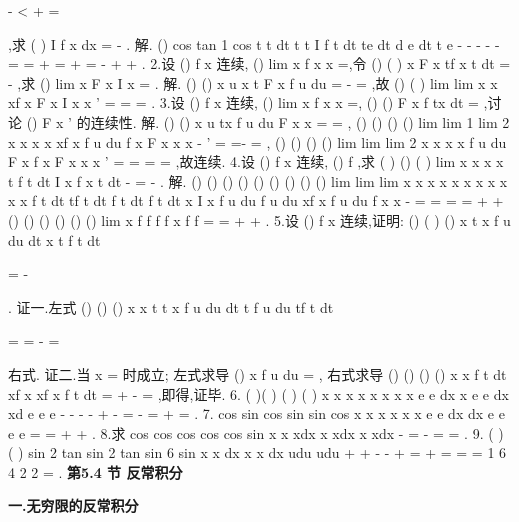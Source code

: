 -\le 
<
+
=

\ge 

,求
(
)
I
f x
dx
=
-
\int 
. 
解.
()
cos
tan
1 cos
t
t
dt
t
t
I
f t dt
te
dt
d
e
dt
t
e
-
-
-
-
-
=
=
+
=
+
=
-
+
+
\int 
\int 
\int 
\int 
\int 
. 
2.设
()
f x 连续,
()
lim
x
f x
x
\to 
=,令
()
(
)
x
F x
tf x
t
dt
=
-
\int 
,求
()
lim
x
F x
I
x
\to 
=
. 
解.
()
()
x
u x
t
F x
f u du
=
-
=
\int 
,故
()
(
)
lim
lim
x
x
xf x
F
x
I
x
x
\to 
\to 
'
=
=
=
. 
3.设
()
f x 连续,
()
lim
x
f x
x
\to 
=,
()
()
F x
f tx dt
=\int 
,讨论
()
F
x
'
的连续性. 
解.
()
()
x
u tx
f u du
F x
x
=
=\int 
,
()
()
()
()
lim
lim
1 lim 2
x
x
x
x
xf x
f u du
f x
F
x
x
x
\to 
\to 
\to 
-
'
=
=-
=
\int 
, 
()
()
()
()
lim
lim
lim 2
x
x
x
x
f u du
F x
f x
F
x
x
x
\to 
\to 
\to 
'
=
=
=
=
\int 
,故连续. 
4.设
()
f x 连续,
()
f
\neq 
,求
(
)
()
(
)
lim
x
x
x
x
t f t dt
I
x
f x
t dt
\to 
-
=
-
\int 
\int 
. 
解.
()
()
()
()
()
()
()
()
()
lim
lim
lim
x
x
x
x
x
x
x
x
x
x
x f t dt
tf t dt
f t dt
f t dt
x
I
x f u du
f u du
xf x
f u du
f x
x
\to 
\to 
\to 
-
=
=
=
=
+
+
\int 
\int 
\int 
\int 
\int 
\int 
\int 
()
()
()
()
()
()
lim
x
f
f
f
f x
f
f
\psi 
\psi 
\to 
=
=
+
+
. 
5.设
()
f x 连续,证明:
()
(
)
()
x
t
x
f u du dt
x
t f t dt


=
-




\int \int 
\int 
. 
证一.左式
()
()
()
x
x
t
t
x
f u du dt
t
f u du
tf t dt




=
=
-
=








\int \int 
\int 
\int 
右式. 
证二.当
x =
时成立; 左式求导
()
x
f u du
=\int 
, 
右式求导
()
()
()
()
x
x
f t dt
xf x
xf x
f t dt
=
+
-
=
\int 
\int 
,即得,证毕. 
6.
(
)(
)
(
)
(
)
x
x
x
x
x
x
x
x
e
e
dx
x e
e
dx
xd e
e
e
-
-
-
-
+
-
=
-
=
+
=
\int 
\int 
\int 
. 
7.
cos
sin
cos
sin
sin
cos
x
x
x
x
x
x
e
e
dx
dx
e
e
e
e
\pi 
\pi 
\pi 
=
=
+
+
\int 
\int 
. 
8.求
cos
cos
cos
cos
cos
sin
x
x
xdx
x
xdx
x
xdx
\pi 
\pi 
\pi 
\pi 
\pi 
\pi 
-
=
-
=
=
\int 
\int 
\int 
. 
9.
(
)
(
)
sin 2
tan
sin 2
tan
sin
6 sin
x
x
dx
x
x
dx
udu
udu
\pi 
\pi 
\pi 
\pi 
\pi 
\pi 
\pi 
+
+
-
-
+
=
+
=
=
=
\int 
\int 
\int 
{} 1
6 4 2 2
\pi 
\pi 
\cdots 
\cdots 
\cdots 
=
. 
\vspace{6pt}
{\large \bfseries \textcolor{lyred}{第5.4 节 反常积分}}

\vspace{4pt}
{\bfseries \textcolor{lyred}{一.无穷限的反常积分}}

